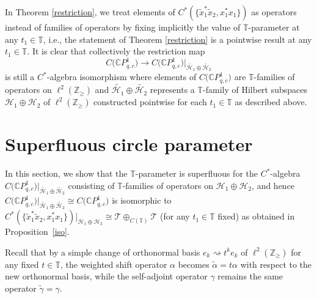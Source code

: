 \documentclass[pdftex]{sigma}
\begin{document}
In Theorem \ref{restriction}, we treat elements of $C^{\ast} ( \{ \tilde{x}%
_{1}^{\ast}\tilde{x}_{2},x_{1}^{\ast}x_{1} \} ) $ as operators
instead of families of operators by fixing implicitly the value of
$\mathbb{T}$-parameter at any $t_{1}\in\mathbb{T}$, i.e., the statement of
Theorem \ref{restriction} is a pointwise result at any $t_{1}\in\mathbb{T}$. It is clear that
collectively the restriction map
\[
C\big(\mathbb{C}P_{q,c}^{1}\big) \rightarrow C\big( \mathbb{C}
P_{q,c}^{1}\big) \big|_{\widetilde{\mathcal{H}_{1}}\oplus\widetilde{\mathcal{H}_{2}}}
\]
is still a $C^*$-algebra isomorphism where elements of $C\big( \mathbb{C}P_{q,c}^{1}\big) $ are $\mathbb{T}$-families of operators on $\ell^{2} ( \mathbb{Z}_{\geq} ) $ and $\widetilde{\mathcal{H}_{1}}\oplus\widetilde{\mathcal{H}_{2}}$ represents a $\mathbb{T}$-family of Hilbert subspaces $\mathcal{H}_{1}\oplus\mathcal{H}_{2}$ of $\ell^{2} (\mathbb{Z}_{\geq} ) $ constructed pointwise for each $t_{1}\in \mathbb{T}$ as described above.

\section{Superfluous circle parameter}

In this section, we show that the $\mathbb{T}$-parameter is superfluous for
the $C^*$-algebra $C\big( \mathbb{C}P_{q,c}^{1}\big)
\big|_{\widetilde{\mathcal{H}_{1}}\oplus\widetilde{\mathcal{H}_{2}}}$ consisting
of $\mathbb{T}$-families of operators on $\mathcal{H}_{1}\oplus\mathcal{H}%
_{2}$, and hence $C\big(\mathbb{C}P_{q,c}^{1}\big)
|_{\widetilde{\mathcal{H}_{1}}\oplus\widetilde{\mathcal{H}_{2}}}\cong C\big(
\mathbb{C}P_{q,c}^{1}\big) $ is isomorphic to $C^{\ast} ( \{
\tilde{x}_{1}^{\ast}\tilde{x}_{2},x_{1}^{\ast}x_{1} \} )
|_{\mathcal{H}_{1}\oplus\mathcal{H}_{2}}\cong\mathcal{T}\oplus_{C (
\mathbb{T} ) }\mathcal{T}$ (for any $t_{1}\in\mathbb{T}$ fixed) as
obtained in Proposition~\ref{iso}.

Recall that by a simple change of orthonormal basis $e_{k}\rightsquigarrow
t^{k}e_{k}$ of $\ell^{2} ( \mathbb{Z}_{\geq} ) $ for any fixed
$t\in\mathbb{T}$, the weighted shift operator $\alpha$ becomes $\tilde{\alpha
}=t\alpha$ with respect to the new orthonormal basis, while the self-adjoint
operator $\gamma$ remains the same operator $\tilde{\gamma}=\gamma$.
\end{document}
